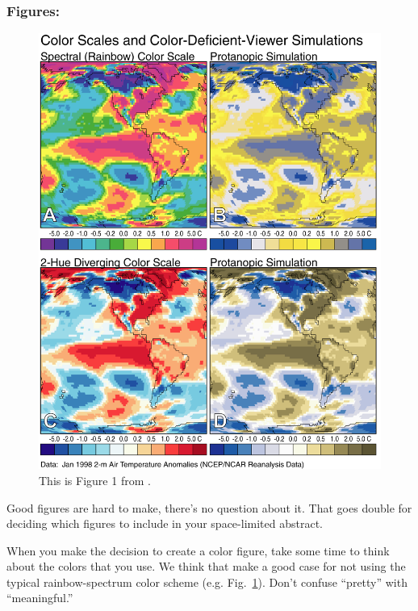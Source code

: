 \documentclass[twoside]{article}
\begin{document}
\subsubsection*{\hspace{0.5cm}Figures:}

\begin{figure}[b]
\begin{center}
\includegraphics[width=\columnwidth]{lb_fig1.png}
\caption{\label{color_scales}
    This is Figure 1 from \citep{light2004end}.
    }
\end{center}
\end{figure}

Good figures are hard to make, there's no question about it.
That goes double for deciding which figures to include in your space-limited abstract.

When you make the decision to create a color figure, take some time to think about the colors that you use.
We think that \citep{light2004end, borland2007rainbow} make a good case for not using the typical rainbow-spectrum color scheme (e.g. Fig.~\ref{color_scales}).
Don't confuse ``pretty'' with ``meaningful.''
\end{document}
